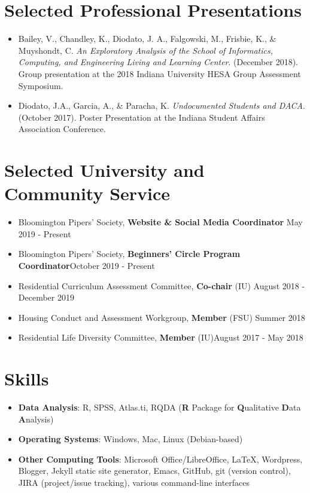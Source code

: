 \documentclass{article}
\begin{document}
\section*{Selected Professional Presentations\hrulefill}
\begin{itemize}
\item Bailey, V., Chandley, K., Diodato, J. A., Falgowski, M., Frisbie, K., \&
  Muyshondt, C. \textit{An Exploratory Analysis of the School of Informatics,
    Computing, and Engineering Living and Learning Center}. (December
  2018). Group presentation at the 2018 Indiana University HESA Group Assessment
  Symposium.
\item Diodato, J.A., Garcia, A., \& Paracha, K. \textit{Undocumented Students
    and DACA}. (October 2017). Poster Presentation at the Indiana Student
  Affairs Association Conference.

\end {itemize}

\section*{Selected University and Community Service \hrulefill}
\begin{itemize}
\item Bloomington Pipers' Society, \textbf{Website \& Social Media Coordinator}
  \hfill May 2019 - Present
\item Bloomington Pipers' Society, \textbf{Beginners' Circle Program
    Coordinator}\hfill October 2019 - Present
\item Residential Curriculum Assessment Committee, \textbf{Co-chair} (IU)\hfill
  August 2018 - December 2019
\item Housing Conduct and Assessment Workgroup, \textbf{Member} (FSU)\hfill
  Summer 2018
\item Residential Life Diversity Committee, \textbf{Member} (IU)\hfill August 2017 -
  May 2018
\end{itemize}

\section*{Skills \hrulefill}
\begin{itemize}
\item \textbf{Data Analysis}: R, SPSS, Atlas.ti, RQDA (\textbf{R} Package for
  \textbf{Q}ualitative \textbf{D}ata \textbf{A}nalysis)
\item \textbf{Operating Systems}: Windows, Mac, Linux (Debian-based)
\item \textbf{Other Computing Tools}: Microsoft Office/LibreOffice, \LaTeX,
  Wordpress, Blogger, Jekyll static site generator, Emacs, GitHub, git (version
  control), JIRA (project/issue tracking), various command-line interfaces 
\end{itemize}
\end{document}
